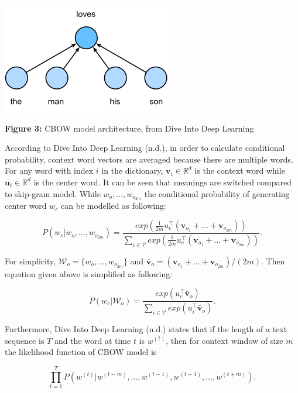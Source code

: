 \documentclass[man]{apa7}
\begin{document}
\begin{center}
\includegraphics[scale=1]{cbow.png}

\textbf{Figure 3:} CBOW model architecture, from Dive Into Deep Learning\\[2\baselineskip]

\end{center}

According to Dive Into Deep Learning (n.d.), in order to calculate conditional probability, context word vectors are averaged because there are multiple words. For any word with index $i$ in the dictionary, $\mathbf{v_\mathit{i}} \in \mathbb{R}^d$ is the context word while $\mathbf{u_\mathit{i}} \in \mathbb{R}^d$  is the center word. It can be seen that meanings are switched compared to skip-gram model. While $w_o,...,w_{o_{2m}}$ the conditional probability of generating center word $w_c$ can be modelled as following:

\begin{equation}
P(w_c|w_o,...,w_{o_{2m}}) = \frac{exp(\frac{1}{2m}u_c^\top(\mathbf{v}_{o_1}+...+\mathbf{v}_{o_{2m}}))}{\sum_{i \in \mathcal{V}} exp(\frac{1}{2m}u_c^\top(\mathbf{v}_{o_1}+...+\mathbf{v}_{o_{2m}}))}.
\end{equation}

For simplicity, $\mathcal{W}_o = \{ w_o,...,w_{o_{2m}}\}$ and $\bar{\mathbf{v}}_o = (\mathbf{v}_{o_1}+...+\mathbf{v}_{o_{2m}})/(2m)$. Then equation given above is simplified as following:

\begin{equation}
P(w_c | \mathcal{W}_o) = \frac{exp(u_c^\top \bar{\mathbf{v}}_o)}{\sum_{i \in \mathcal{V}} exp(u_i^\top \bar{\mathbf{v}}_o)}.
\end{equation}

Furthermore, Dive Into Deep Learning (n.d.) states that if the length of a text sequence is $\mathit{T}$ and the word at time $t$ is $w^{(t)}$, then for context window of size $m$ the likelihood function of CBOW model is

\begin{equation}
\prod_{t=1}^T P(w^{(t)}| w^{(t-m)},..., w^{(t-1)},w^{(t+1)},...,w^{(t+m)}).
\end{equation}
\end{document}

